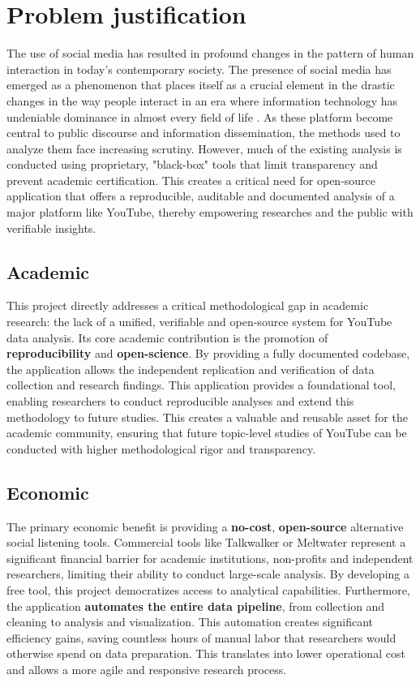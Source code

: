 \section{Problem justification}

The use of social media has resulted in profound changes in the pattern of human interaction in today's contemporary society. The presence of social media has emerged as a phenomenon that places itself as a crucial element in the drastic changes in the way people interact in an era where information technology has undeniable dominance in almost every field of life \parencite{azzaakiyyah2023impact}. As these platform become central to public discourse and information dissemination, the methods used to analyze them face increasing scrutiny. However, much of the existing analysis is conducted using proprietary, "black-box" tools that limit transparency and prevent academic certification. This creates a critical need for open-source application that offers a reproducible, auditable and documented analysis of a major platform like YouTube, thereby empowering researches and the public with verifiable insights.


\subsection{Academic}

This project directly addresses a critical methodological gap in academic research: the lack of a unified, verifiable and open-source system for YouTube data analysis. Its core academic contribution is the promotion of \textbf{reproducibility} and \textbf{open-science}. By providing a fully documented codebase, the application allows the independent replication and verification of data collection and research findings. This application provides a foundational tool, enabling researchers to conduct reproducible analyses and extend this methodology to future studies. This creates a valuable and reusable asset for the academic community, ensuring that future topic-level studies of YouTube can be conducted with higher methodological rigor and transparency.

\subsection{Economic}

The primary economic benefit is providing a \textbf{no-cost}, \textbf{open-source} alternative social listening tools. Commercial tools like Talkwalker or Meltwater represent a significant financial barrier for academic institutions, non-profits and independent researchers, limiting their ability to conduct large-scale analysis. By developing a free tool, this project democratizes access to analytical capabilities. Furthermore, the application \textbf{automates the entire data pipeline}, from collection and cleaning to analysis and visualization. This automation creates significant efficiency gains, saving countless hours of manual labor that researchers would otherwise spend on data preparation. This translates into lower operational cost and allows a more agile and responsive research process.

